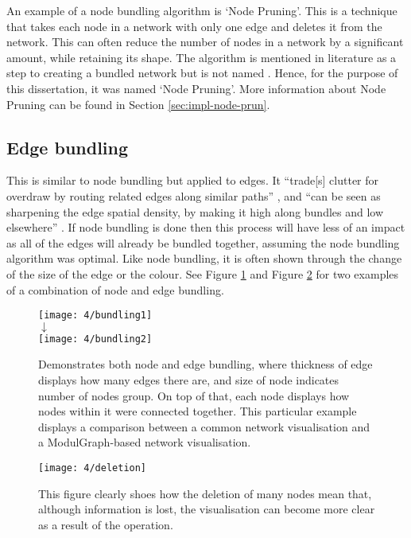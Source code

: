 \documentclass[../dissertation.tex]{subfiles}
\begin{document}
An example of a node bundling algorithm is `Node Pruning'. This is a technique that takes each node in a network with only one edge and deletes it from the network. This can often reduce the number of nodes in a network by a significant amount, while retaining its shape. The algorithm is mentioned in literature as a step to creating a bundled network but is not named \cite{brandes2003experiments}. Hence, for the purpose of this dissertation, it was named `Node Pruning'. More information about Node Pruning can be found in Section \ref{sec:impl-node-prun}.

\subsection{Edge bundling}
\label{sec:edge_bundling}

This is similar to node bundling but applied to edges. It ``trade[s] clutter for overdraw by routing related edges along similar paths'' \cite{hurter2012graph}, and ``can be seen as sharpening the edge spatial density, by making it high along bundles and low elsewhere'' \cite{hurter2012graph}. If node bundling is done then this process will have less of an impact as all of the edges will already be bundled together, assuming the node bundling algorithm was optimal. Like node bundling, it is often shown through the change of the size of the edge or the colour. See Figure \ref{fig:bundling} and Figure \ref{fig:deletion} for two examples of a combination of node and edge bundling.
\begin{figure}[htb]
    \centering
    \texttt{[image: 4/bundling1]}
    \\$\downarrow$\\
    \texttt{[image: 4/bundling2]}
    \caption{Demonstrates both node and edge bundling, where thickness of edge displays how many edges there are, and size of node indicates number of nodes group. On top of that, each node displays how nodes within it were connected together. This particular example displays a comparison between a common network visualisation and a ModulGraph-based network visualisation. \cite{li2015modulgraph}}
    \label{fig:bundling}
\end{figure}

\begin{figure}[htb]
    \centering
    \texttt{[image: 4/deletion]}
    \caption{This figure clearly shoes how the deletion of many nodes mean that, although information is lost, the visualisation can become more clear as a result of the operation. \cite{hu2015visualizing}}
    \label{fig:deletion}
\end{figure}
\end{document}

